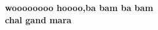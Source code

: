 \documentclass[preview]{standalone}
\begin{document}
\begin{center}
\textbf{woooooooo hoooo,ba bam ba bam \\ chal gand mara}
\end{center}
\end{document}

